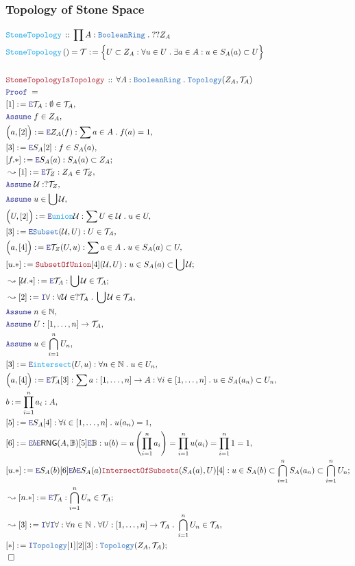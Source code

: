\documentclass[12pt]{scrartcl}
\newcommand{\TYPE}[1]{\textcolor{NavyBlue}{\mathtt{#1}}}
\newcommand{\FUNC}[1]{\textcolor{Cerulean}{\mathtt{#1}}}
\newcommand{\LOGIC}[1]{\textcolor{Blue}{\mathtt{#1}}}
\newcommand{\THM}[1]{\textcolor{Maroon}{\mathtt{#1}}}
\renewcommand{\.}{\; . \;}
\newcommand{\de}{: \kern 0.1pc =}
\newcommand{\Act}[1]{\left( #1 \right)}
\newcommand{\Theorem}[2]{& \THM{#1} \, :: \, #2 \\ & \Proof = \\ }
\newcommand{\DeclareFunc}[2]{& \FUNC{#1} \, :: \, #2 \\}
\newcommand{\DefineNamedFunc}[4]{&  \FUNC{#1}\Act{#2} = #3 \de #4 \\}
\newcommand{\Page}[1]{ \begin{align*} #1 \end{align*}   }
\newcommand{\Intro}{\LOGIC{I}}
\newcommand{\Elim}{\LOGIC{E}}
\newcommand{\Nat}{\mathbb{N} }
\newcommand{\Say}[3]{& #1 \de #2 : #3, \\}
\newcommand{\Conclude}[3]{& #1 \de #2 : #3; \\}
\newcommand{\Derive}[3]{& \leadsto #1 \de #2 : #3, \\}
\newcommand{\DeriveConclude}[3]{& \leadsto #1 \de #2 : #3 ; \\}
\newcommand{\Assume}[2]{& \LOGIC{Assume} \; #1 : #2, \\}
\newcommand{\AssumeIn}[2]{& \LOGIC{Assume} \; #1 \in #2, \\}
\newcommand{\QED}{\; \square}
\newcommand{\EndProof}{& \QED \\}
\newcommand{\Proof}{\LOGIC{Proof} \; }
\newcommand{\RNG}{\mathsf{RNG}}
\newcommand{\T}{\mathcal{T}}
\newcommand{\U}{\mathcal{U}}
\newcommand{\Bool}{\mathbb{B}}
\newcommand{\BR}{\TYPE{BooleanRing}}
\begin{document}
\subsubsection{Topology of Stone Space}
\Page{
	\DeclareFunc{StoneTopology}{\prod A : \BR \. ??Z_A}
	\DefineNamedFunc{StoneTopology}{}{\T}
	{
		\Big\{ U \subset Z_A : \forall u \in U \. \exists a \in A :  u \in S_A(a) \subset U   \Big\}
	}
	\\
	\Theorem{StoneTopologyIsTopology}
	{
		\forall A : \BR \. \TYPE{Topology}(Z_A,\T_A)
	}
	\Say{[1]}{\Elim \T_A}{\emptyset \in \T_A}
	\AssumeIn{f}{Z_A}
	\Say{\Big(a,[2]\Big)}{\Elim Z_A(f)}{\sum a \in A \. f(a) = 1}
	\Say{[3]}{\Elim S_A [2]}{ f \in S_A(a)}
	\Conclude{[f.*]}{\Elim S_A(a)}
	{
		S_A(a) \subset Z_A
	}
	\Derive{[1]}{\Elim \T_Z}{ Z_A \in \T_Z}
	\Assume{\U}{?\T_Z}
	\AssumeIn{u}{\bigcup \U}
	\Say{\Big(U,[2]\Big)}{\Elim \FUNC{union} \U}{ \sum U \in \U \. u \in U  }
	\Say{[3]}{\Elim \TYPE{Subset}(\U,U)}{U \in \T_A}
	\Say{\Big(a,[4]\Big)}{\Elim \T_Z(U,u)}
	{
		\sum a \in A \.  u \in S_A(a) \subset U
	}
	\Conclude{[u.*]}{\THM{SubsetOfUnion}[4](\U,U)}{ u \in S_A(a) \subset \bigcup \U }
	\DeriveConclude{[\U.*]}{\Elim \T_A}{\bigcup \U \in \T_A}
	\Derive{[2]}{\Intro \forall}{\forall \U \in ?\T_A \. \bigcup \U \in \T_A}
	\AssumeIn{n}{\Nat}
	\Assume{U}{[1,\ldots,n] \to \T_A}
	\AssumeIn{u}{\bigcap^n_{i=1} U_n }
	\Say{[3]}{\Elim \FUNC{intersect}(U,u)}{ \forall n \in \Nat \. u \in U_n}
	\Say{\Big(a,[4]\Big)}{\Elim \T_A [3] }
	{
		\sum a : [1,\ldots,n]  \to A : \forall i \in [1,\ldots,n] \. u \in S_A(a_n) \subset U_n 
	}
	\Say{b}{\prod^n_{i=1} a_i}{A}
	\Say{[5]}{\Elim S_A [4]}{ \forall i \in [1,\ldots,n] \. u(a_n) = 1}
	\Say{[6]}{ \Elim b \Elim \RNG (A,\Bool)[5] \Elim \Bool  }{ 
		u(b) = 
		u\left(\prod^n_{i=1} a_i \right) =  
		\prod^n_{i=1} u(a_i) = 
		\prod^n_{i=1} 1 =
		1
	}
	\Conclude{[u.*]}{\Elim S_A(b)[6] \Elim b \Elim S_A(a) \THM{IntersectOfSubsets}(S_A(a),U)[4] }
	{ 
		u \in S_A(b) \subset \bigcap^n_{i=1} S_A(a_n) \subset \bigcap^n_{i=1} U_n
	}
	\DeriveConclude{[n.*]}{\Elim \T_A}{\bigcap^n_{i=1} U_n \in \T_A}
	\Derive{[3]}{\Intro \forall \Intro \forall}
	{
		\forall n \in \Nat \. 
		\forall U : [1,\ldots,n] \to \T_A \.
		\bigcap^n_{i=1} U_n \in \T_A
	}
	\Conclude{[*]}{\Intro \TYPE{Topology}[1][2][3]}{\TYPE{Topology}(Z_A,\T_A)}
	\EndProof
}
\end{document}
